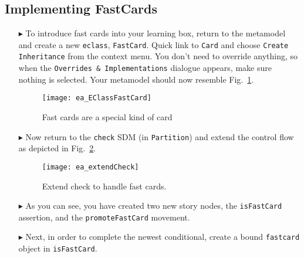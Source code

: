 \newpage
\subsection{Implementing FastCards}
\visHeader
\hypertarget{fastCard vis}{}

\begin{itemize}

\item[$\blacktriangleright$] To introduce fast cards into your learning box, return to the metamodel and create a new \texttt{eclass}, \texttt{FastCard}.
Quick link to \texttt{Card} and choose \texttt{Create Inheritance} from the context menu. You don't need to override anything, so
when the \texttt{Overrides \& Implementations} dialogue appears, make sure nothing is selected. Your metamodel should now resemble
Fig.~\ref{fig:metamodel_FastCard}.

\vspace{0.5cm}

\begin{figure}[htp]
\begin{center}
  \texttt{[image: ea\_EClassFastCard]}
  \caption{Fast cards are a special kind of card}  
  \label{fig:metamodel_FastCard}
\end{center}
\end{figure}

\vspace{0.5cm}

\item[$\blacktriangleright$] Now return to the \texttt{check} SDM (in \texttt{Partition}) and extend the control flow as depicted in
Fig.~\ref{fig:extendCheck}.

\begin{figure}[htbp]
\begin{center}
  \texttt{[image: ea\_extendCheck]}
  \caption{Extend check to handle fast cards.}  
  \label{fig:extendCheck}
\end{center}
\end{figure}
 
 \vspace{0.5cm}
 
\item[$\blacktriangleright$] As you can see, you have created two new story nodes, the \texttt{isFastCard} assertion, and the \texttt{promoteFastCard} movement.

\vspace{0.5cm}
 
\item[$\blacktriangleright$] Next, in order to complete the newest conditional, create a bound \texttt{fastcard} object in \texttt{isFastCard}. 


\end{itemize}

